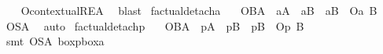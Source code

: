 \begin{isabellebody}
%
\isadelimproof
\ \ %
\endisadelimproof
%
\isatagproof
{}\isamarkupfalse%
\ O{\isacharunderscore}contextual{\isacharunderscore}REA\ \isamarkupfalse%
\ blast\isanewline
\isanewline
%
%
\endisatagproof
{\isafoldproof}%
%
\isadelimproof
\isanewline
%
\endisadelimproof
{}\isamarkupfalse%
\ factual{\isacharunderscore}detach{\isacharunderscore}a{\isacharcolon}\isanewline
\ \ \ {\isachardoublequoteopen}{\isasymTurnstile}{\isacharparenleft}{\isacharparenleft}{\isacharparenleft}O{\isacharbraceleft}B{\isacharbar}A{\isacharbraceright}\ \isactrlbold {\isasymand}\ {\isacharparenleft}{\isasymbox}\isactrlsub aA{\isacharparenright}{\isacharparenright}\ \isactrlbold {\isasymand}\ {\isacharparenleft}{\isacharparenleft}{\isasymdiamond}\isactrlsub aB{\isacharparenright}\ \isactrlbold {\isasymand}\ {\isacharparenleft}{\isasymdiamond}\isactrlsub a{\isacharparenleft}\isactrlbold {\isasymnot}B{\isacharparenright}{\isacharparenright}{\isacharparenright}{\isacharparenright}\ \isactrlbold {\isasymrightarrow}\ {\isacharparenleft}O\isactrlsub a\ B{\isacharparenright}{\isacharparenright}{\isachardoublequoteclose}\isanewline
%
\isadelimproof
\ \ %
\endisadelimproof
%
\isatagproof
{}\isamarkupfalse%
\ O{\isacharunderscore}SA\ \isamarkupfalse%
\ auto%
\endisatagproof
{\isafoldproof}%
%
\isadelimproof
\isanewline
%
\endisadelimproof
{}\isamarkupfalse%
\ factual{\isacharunderscore}detach{\isacharunderscore}p{\isacharcolon}\isanewline
\ \ \ {\isachardoublequoteopen}{\isasymTurnstile}{\isacharparenleft}{\isacharparenleft}{\isacharparenleft}O{\isacharbraceleft}B{\isacharbar}A{\isacharbraceright}\ \isactrlbold {\isasymand}\ {\isacharparenleft}{\isasymbox}\isactrlsub pA{\isacharparenright}{\isacharparenright}\ \isactrlbold {\isasymand}\ {\isacharparenleft}{\isacharparenleft}{\isasymdiamond}\isactrlsub pB{\isacharparenright}\ \isactrlbold {\isasymand}\ {\isacharparenleft}{\isasymdiamond}\isactrlsub p{\isacharparenleft}\isactrlbold {\isasymnot}B{\isacharparenright}{\isacharparenright}{\isacharparenright}{\isacharparenright}\ \isactrlbold {\isasymrightarrow}\ {\isacharparenleft}O\isactrlsub p\ B{\isacharparenright}{\isacharparenright}{\isachardoublequoteclose}\isanewline
%
\isadelimproof
\ \ %
\endisadelimproof
%
\isatagproof
{}\isamarkupfalse%
\ {\isacharparenleft}smt\ O{\isacharunderscore}SA\ boxp{\isacharunderscore}boxa{\isacharparenright}%
\endisatagproof
{\isafoldproof}%
%
\isadelimproof
\isanewline
%
\endisadelimproof
%
\isadelimtheory
\isanewline
%
\endisadelimtheory
%
\isatagtheory
{}\isamarkupfalse%
%
\endisatagtheory
{\isafoldtheory}%
%
\isadelimtheory
%
\endisadelimtheory
%
\end{isabellebody}%
